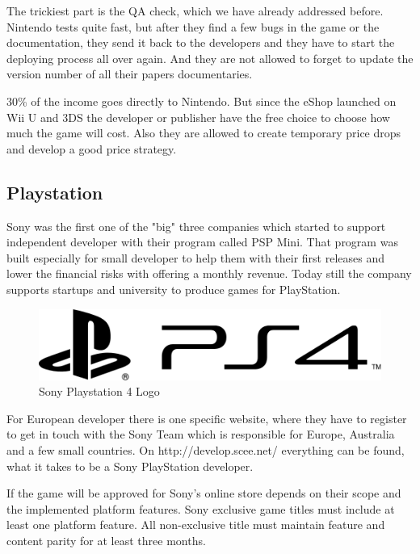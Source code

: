 The trickiest part is the QA check, which we have already addressed before. Nintendo tests quite fast, but after they find a few bugs in the game or the documentation, they send it back to the developers and they have to start the deploying process all over again. And they are not allowed to forget to update the version number of all their papers documentaries.

30\% of the income goes directly to Nintendo. But since the eShop launched on Wii U and 3DS the developer or publisher have the free choice to choose how much the game will cost. Also they are allowed to create temporary price drops and develop a good price strategy. \citep{hill_indie_2015}

\subsection{Playstation}
\label{subsec:playstation}
Sony was the first one of the "big" three companies which started to support independent developer with their program called PSP Mini. That program was built especially for small developer to help them with their first releases and lower the financial risks with offering a monthly revenue. Today still the company supports startups and university to produce games for PlayStation.

\begin{figure}[!hbp]
\includegraphics[width=\linewidth]{img/ps4.png}
\centering
\caption{ Sony Playstation 4 Logo }
\label{fig:ps4}
\end{figure}

For European developer there is one specific website, where they have to register to get in touch with the Sony Team which is responsible for Europe, Australia and a few small countries. On http://develop.scee.net/ everything can be found, what it takes to be a Sony PlayStation developer. \citep{hill_indie_2015}

If the game will be approved for Sony's online store depends on their scope and the implemented platform features. Sony exclusive game titles must include at least one platform feature. All non-exclusive title must maintain feature and content parity for at least three months.

